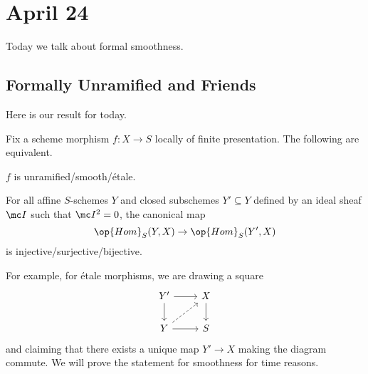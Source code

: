 \documentclass[../notes.tex]{subfiles}
\begin{document}
\section{April 24}

Today we talk about formal smoothness.

\subsection{Formally Unramified and Friends}
Here is our result for today.
\begin{theorem}
	Fix a scheme morphism $f\colon X\to S$ locally of finite presentation. The following are equivalent.
	\begin{listalph}
		\item $f$ is unramified/smooth/\'etale.
		\item For all affine $S$-schemes $Y$ and closed subschemes $Y'\subseteq Y$ defined by an ideal sheaf $\mc I$ such that $\mc I^2=0$, the canonical map
		\[\op{Hom}_S(Y,X)\to\op{Hom}_S(Y',X)\]
		is injective/surjective/bijective.
	\end{listalph}
\end{theorem}
For example, for \'etale morphisms, we are drawing a square
\[\begin{tikzcd}
	{Y'} & X \\
	Y & S
	\arrow[from=1-1, to=2-1]
	\arrow[from=2-1, to=2-2]
	\arrow[from=1-2, to=2-2]
	\arrow[from=1-1, to=1-2]
	\arrow[dashed, from=2-1, to=1-2]
\end{tikzcd}\]
and claiming that there exists a unique map $Y'\to X$ making the diagram commute. We will prove the statement for smoothness for time reasons.
\end{document}
